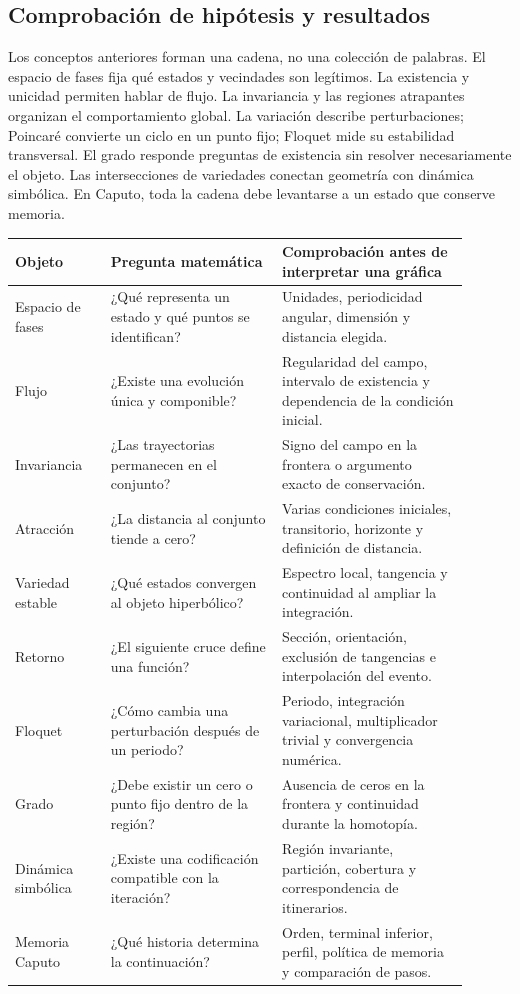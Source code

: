 \subsection{Comprobación de hipótesis y resultados}

Los conceptos anteriores forman una cadena, no una colección de palabras. El espacio
de fases fija qué estados y vecindades son legítimos. La existencia y unicidad
permiten hablar de flujo. La invariancia y las regiones atrapantes organizan el
comportamiento global. La variación describe perturbaciones; Poincaré convierte un
ciclo en un punto fijo; Floquet mide su estabilidad transversal. El grado responde
preguntas de existencia sin resolver necesariamente el objeto. Las intersecciones de
variedades conectan geometría con dinámica simbólica. En Caputo, toda la cadena debe
levantarse a un estado que conserve memoria.

\begin{longtable}{>{\raggedright\arraybackslash}p{0.19\linewidth}
                  >{\raggedright\arraybackslash}p{0.34\linewidth}
                  >{\raggedright\arraybackslash}p{0.37\linewidth}}
\toprule
Objeto & Pregunta matemática & Comprobación antes de interpretar una gráfica\\
\midrule
\endhead
Espacio de fases & ¿Qué representa un estado y qué puntos se identifican? & Unidades,
periodicidad angular, dimensión y distancia elegida.\\
Flujo & ¿Existe una evolución única y componible? & Regularidad del campo, intervalo
de existencia y dependencia de la condición inicial.\\
Invariancia & ¿Las trayectorias permanecen en el conjunto? & Signo del campo en la
frontera o argumento exacto de conservación.\\
Atracción & ¿La distancia al conjunto tiende a cero? & Varias condiciones iniciales,
transitorio, horizonte y definición de distancia.\\
Variedad estable & ¿Qué estados convergen al objeto hiperbólico? & Espectro local,
tangencia y continuidad al ampliar la integración.\\
Retorno & ¿El siguiente cruce define una función? & Sección, orientación, exclusión de
tangencias e interpolación del evento.\\
Floquet & ¿Cómo cambia una perturbación después de un periodo? & Periodo, integración
variacional, multiplicador trivial y convergencia numérica.\\
Grado & ¿Debe existir un cero o punto fijo dentro de la región? & Ausencia de ceros en
la frontera y continuidad durante la homotopía.\\
Dinámica simbólica & ¿Existe una codificación compatible con la iteración? & Región
invariante, partición, cobertura y correspondencia de itinerarios.\\
Memoria Caputo & ¿Qué historia determina la continuación? & Orden, terminal inferior,
perfil, política de memoria y comparación de pasos.\\
\bottomrule
\end{longtable}

